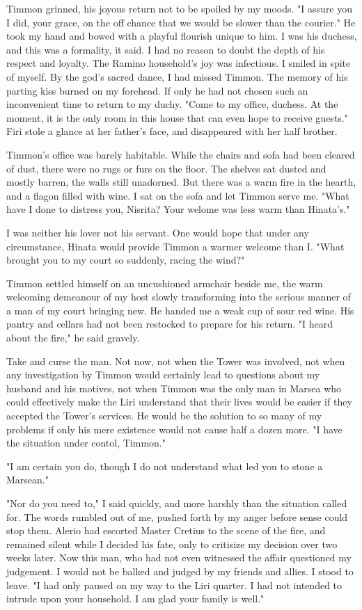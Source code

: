 \documentclass{article}
\begin{document}
Timmon grinned, his joyous return not to be spoiled by my moods. "I assure you I did, your grace, on the off chance that we would be slower than the courier." He took my hand and bowed with a playful flourish unique to him. I was his duchess, and this was a formality, it said. I had no reason to doubt the depth of his respect and loyalty. The Ramino household's joy was infectious. I smiled in spite of myself. By the god's sacred dance, I had missed Timmon. The memory of his parting kiss burned on my forehead. If only he had not chosen such an inconvenient time to return to my duchy. "Come to my office, duchess. At the moment, it is the only room in this house that can even hope to receive guests." Firi stole a glance at her father's face, and disappeared with her half brother.

Timmon's office was barely habitable. While the chairs and sofa had been cleared of dust, there were no rugs or furs on the floor. The shelves sat dusted and mostly barren, the walls still unadorned. But there was a warm fire in the hearth, and a flagon filled with wine. I sat on the sofa and let Timmon serve me. "What have I done to distress you, Nisrita? Your welome was less warm than Hinata's."

I was neither his lover not his servant. One would hope that under any circumstance, Hinata would provide Timmon a warmer welcome than I. "What brought you to my court so suddenly, racing the wind?"

Timmon settled himself on an uncushioned armchair beside me, the warm welcoming demeanour of my host slowly transforming into the serious manner of a man of my court bringing new. He handed me a weak cup of sour red wine. His pantry and cellars had not been restocked to prepare for his return. "I heard about the fire," he said gravely.

Take and curse the man. Not now, not when the Tower was involved, not when any investigation by Timmon would certainly lead to questions about my husband and his motives, not when Timmon was the only man in Marsea who could effectively make the Liri understand that their lives would be easier if they accepted the Tower's services. He would be the solution to so many of my problems if only his mere existence would not cause half a dozen more. "I have the situation under contol, Timmon."

"I am certain you do, though I do not understand what led you to stone a Marsean."

"Nor do you need to," I said quickly, and more harshly than the situation called for. The words rumbled out of me, pushed forth by my anger before sense could stop them. Alerio had escorted Master Cretius to the scene of the fire, and remained silent while I decided his fate, only to critisize my decision over two weeks later. Now this man, who had not even witnessed the affair questioned my judgement. I would not be balked and judged by my friends and allies. I stood to leave. "I had only paused on my way to the Liri quarter. I had not intended to intrude upon your household. I am glad your family is well."
\end{document}
